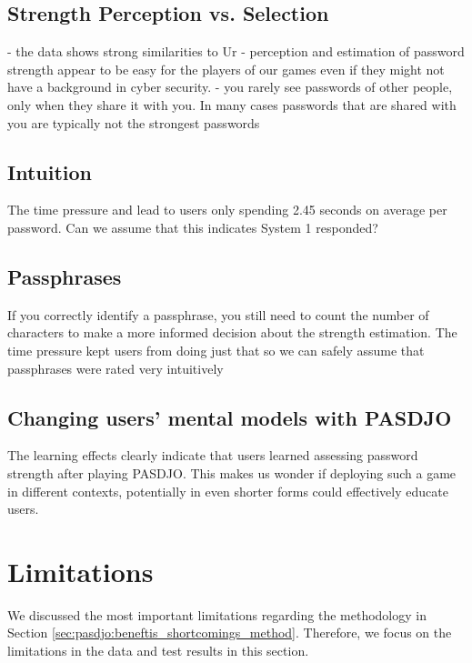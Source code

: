 \subsection{Strength Perception vs. Selection}
- the data shows strong similarities to Ur \etal \cite{Ur2016PerceptionsPassword}
- perception and estimation of password strength appear to be easy for the players of our games even if they might not have a background in cyber security. 
- you rarely see passwords of other people, only when they share it with you. In many cases passwords that are shared with you are typically not the strongest passwords \cite{Haque2014Hierarchy,  Shay2010EncounteringPasswordRequirements, Singh2007PasswordSharing, Violettas2014PasswordsAvoidGreece, Weirich2001PrettyGoodPersuasion, ZhangKennedy2016RevisitingPasswordRules} 

\subsection{Intuition}
The time pressure and lead to users only spending 2.45 seconds on average per password. Can we assume that this indicates System 1 responded?

\subsection{Passphrases}
If you correctly identify a passphrase, you still need to count the number of characters to make a more informed decision about the strength estimation. The time pressure kept users from doing just that so we can safely assume that passphrases were rated very intuitively %


\subsection{Changing users' mental models with PASDJO}
The learning effects clearly indicate that users learned assessing password strength after playing PASDJO. This makes us wonder if deploying such a game in different contexts, potentially in even shorter forms could effectively educate users. 

\section{Limitations}
We discussed the most important limitations regarding the methodology in Section \ref{sec:pasdjo:beneftis_shortcomings_method}. Therefore, we focus on the limitations in the data and test results in this section. 


